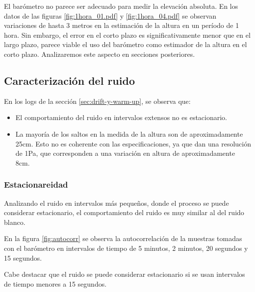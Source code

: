 \documentclass[main]{subfiles}
\begin{document}
El bar\'ometro no parece ser adecuado para medir la elevaci\'on absoluta. En los datos de las figuras \ref{fig:1hora_01.pdf} y \ref{fig:1hora_04.pdf} se observan variaciones de hasta 3 metros en la estimaci\'on de la altura en un per\'iodo de 1 hora. Sin embargo, el error en el corto plazo es significativamente menor que en el largo plazo, parece viable el uso del bar\'ometro como estimador de la altura en el corto plazo. Analizaremos este aspecto en secciones posteriores.

\subsection{Caracterizaci\'on del ruido}
\label{sec:caract-ruido}

En los logs de la secci\'on \ref{sec:drift-y-warm-up}, se observa que:
\begin{itemize}
\item El comportamiento del ruido en intervalos extensos no es estacionario.
\item La mayor\'ia de los saltos en la medida de la altura son de aproximadamente 25cm. Esto no es coherente con las especificaciones, ya que dan una resoluci\'on de 1Pa, que corresponden a una variaci\'on en altura de aproximadamente 8cm.
\end{itemize}

\subsubsection{Estacionareidad}

Analizando el ruido en intervalos m\'as peque\~nos, donde el proceso se puede considerar estacionario, el comportamiento del ruido es muy similar al del ruido blanco.

En la figura \ref{fig:autocorr} se observa la autocorrelaci\'on de la muestras tomadas con el bar\'ometro en intervalos de tiempo de 5 minutos, 2 minutos, 20 segundos y 15 segundos.

Cabe destacar que el ruido se puede considerar estacionario si se usan intervalos de tiempo menores a 15 segundos.
\end{document}

